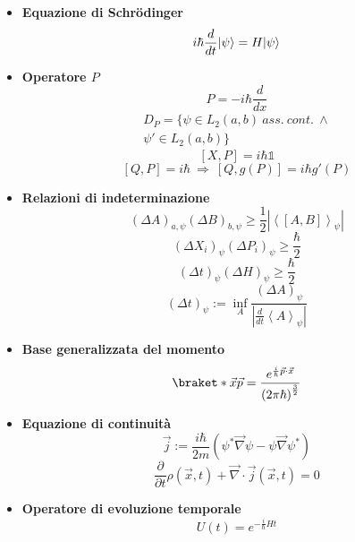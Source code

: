\documentclass{article}
\DeclarePairedDelimiter\ket{\lvert}{\rangle}
\begin{document}
\begin{small}
\begin{multicols*}{3}
\begin{itemize}[leftmargin=*]
	\item \textbf{Equazione di Schr\"{o}dinger}
		\[i\hbar \frac{d}{dt} \ket{\psi } = H\ket{\psi }\]
	\item \textbf{Operatore $P$}
		\[P=-i\hbar \frac{d}{dx}\]
		\begin{align*}
			D_P = \{\psi \in L_2(a,b)\ ass.\ cont.\ \land \\ \psi'\in L_2(a,b)\}
		\end{align*}
		\[\left[X,P\right] = i\hbar \mathds{1}\]
		\[\left[Q,P\right] = i\hbar \ \Rightarrow \ \left[Q,g(P)\right] = i\hbar g'(P)\]
	\item \textbf{Relazioni di indeterminazione}
		\[\left(\Delta A\right)_{a,\psi }\left(\Delta  B\right)_{b,\psi } \geq  \frac{1}{2} \left|\left<\left[A,B\right]\right>_{\psi }\right|\]
		\[\left(\Delta X_i\right)_\psi \left(\Delta P_i\right)_\psi \geq  \frac{\hbar }{2}\]
		\[\left(\Delta t\right)_\psi \left(\Delta H\right)_\psi \geq  \frac{\hbar }{2}\]
		\[\left(\Delta t\right)_\psi := \inf_A \frac{\left(\Delta A\right)_\psi }{\left|\frac{d}{dt} \left< A\right>_\psi \right|}\]
	\item \textbf{Base generalizzata del momento}
		\[\braket*{\vec{x}}{\vec{p}} = \frac{e^{\frac{i}{\hbar }\vec{p}\cdot \vec{x}}}{\left(2\pi \hbar \right)^{\frac{3}{2}}}\]
	\item \textbf{Equazione di continuità}
		\[\vec{j}:= \frac{i\hbar }{2m} \left(\psi ^* \vec{\nabla }\psi  - \psi \vec{\nabla }\psi ^*\right)\]
		\[\frac{\partial}{\partial t}\rho \left(\vec{x},t\right) + \vec{\nabla} \cdot \vec{j}\left(\vec{x},t\right)=0\]
	\item \textbf{Operatore di evoluzione temporale}
		\[U\left(t\right) = e^{-\frac{i}{\hbar } Ht}\]


\end{itemize}
\end{multicols*}
\end{small}
\end{document}
